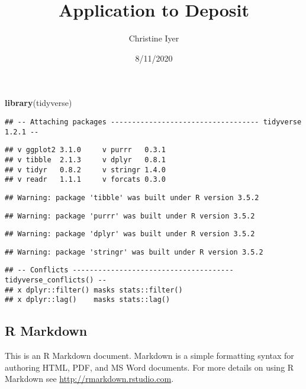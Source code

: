 \documentclass[]{article}
\title{Application to Deposit}
\author{Christine Iyer}
\date{8/11/2020}
\newenvironment{Shaded}{\begin{snugshade}}{\end{snugshade}}
\newcommand{\KeywordTok}[1]{\textcolor[rgb]{0.13,0.29,0.53}{\textbf{#1}}}
\newcommand{\NormalTok}[1]{#1}
\begin{document}
\maketitle

\begin{Shaded}
\begin{Highlighting}[]
\KeywordTok{library}\NormalTok{(tidyverse)}
\end{Highlighting}
\end{Shaded}

\begin{verbatim}
## -- Attaching packages ----------------------------------- tidyverse 1.2.1 --
\end{verbatim}

\begin{verbatim}
## v ggplot2 3.1.0     v purrr   0.3.1
## v tibble  2.1.3     v dplyr   0.8.1
## v tidyr   0.8.2     v stringr 1.4.0
## v readr   1.1.1     v forcats 0.3.0
\end{verbatim}

\begin{verbatim}
## Warning: package 'tibble' was built under R version 3.5.2
\end{verbatim}

\begin{verbatim}
## Warning: package 'purrr' was built under R version 3.5.2
\end{verbatim}

\begin{verbatim}
## Warning: package 'dplyr' was built under R version 3.5.2
\end{verbatim}

\begin{verbatim}
## Warning: package 'stringr' was built under R version 3.5.2
\end{verbatim}

\begin{verbatim}
## -- Conflicts -------------------------------------- tidyverse_conflicts() --
## x dplyr::filter() masks stats::filter()
## x dplyr::lag()    masks stats::lag()
\end{verbatim}

\subsection{R Markdown}\label{r-markdown}

This is an R Markdown document. Markdown is a simple formatting syntax
for authoring HTML, PDF, and MS Word documents. For more details on
using R Markdown see \url{http://rmarkdown.rstudio.com}.
\end{document}
